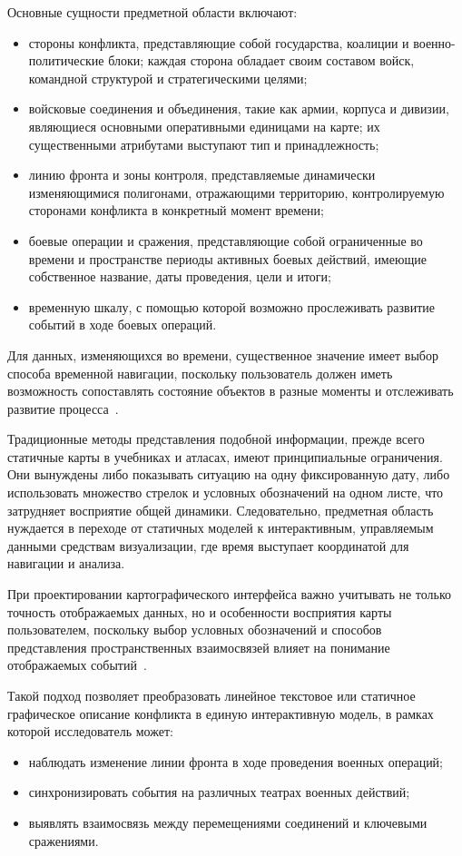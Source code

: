 Основные сущности предметной области включают:
\begin{itemize}
\item стороны конфликта, представляющие собой государства, коалиции и военно-политические блоки; каждая сторона обладает своим составом войск, командной структурой и стратегическими целями;
\item войсковые соединения и объединения, такие как армии, корпуса и дивизии, являющиеся основными оперативными единицами на карте; их существенными атрибутами выступают тип и принадлежность;
\item линию фронта и зоны контроля, представляемые динамически изменяющимися полигонами, отражающими территорию, контролируемую сторонами конфликта в конкретный момент времени;
\item боевые операции и сражения, представляющие собой ограниченные во времени и пространстве периоды активных боевых действий, имеющие собственное название, даты проведения, цели и итоги;
\item временную шкалу, с помощью которой возможно прослеживать развитие событий в ходе боевых операций.
\end{itemize}

Для данных, изменяющихся во времени, существенное значение имеет выбор способа временной навигации, поскольку пользователь должен иметь возможность сопоставлять состояние объектов в разные моменты и отслеживать развитие процесса~\cite{aigner_time_oriented_data}.

Традиционные методы представления подобной информации, прежде всего статичные карты в учебниках и атласах, имеют принципиальные ограничения. Они вынуждены либо показывать ситуацию на одну фиксированную дату, либо использовать множество стрелок и условных обозначений на одном листе, что затрудняет восприятие общей динамики. Следовательно, предметная область нуждается в переходе от статичных моделей к интерактивным, управляемым данными средствам визуализации, где время выступает координатой для навигации и анализа.

При проектировании картографического интерфейса важно учитывать не только точность отображаемых данных, но и особенности восприятия карты пользователем, поскольку выбор условных обозначений и способов представления пространственных взаимосвязей влияет на понимание отображаемых событий~\cite{maceachren_how_maps_work}.

Такой подход позволяет преобразовать линейное текстовое или статичное графическое описание конфликта в единую интерактивную модель, в рамках которой исследователь может:
\begin{itemize}
\item наблюдать изменение линии фронта в ходе проведения военных операций;
\item синхронизировать события на различных театрах военных действий;
\item выявлять взаимосвязь между перемещениями соединений и ключевыми сражениями.
\end{itemize}

